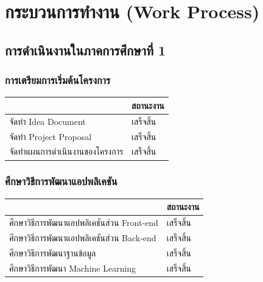 \documentclass[14pt,oneside,openright,a4paper]{cpe-thai-project}
\begin{document}
\section{กระบวนการทำงาน (Work Process)}
\subsection{การดำเนินงานในภาคการศึกษาที่ 1}
  \subsubsection{การเตรียมการเริ่มต้นโครงการ}
    \begin{table}[!h]\centering
      \begin{tabular}{|l|l|}
      \hline
      \rowcolor[HTML]{9FC5E8} 
      \multicolumn{1}{|c|}{\cellcolor[HTML]{9FC5E8}ภาระงาน} & \multicolumn{1}{c|}{\cellcolor[HTML]{9FC5E8}สถานะงาน} \\ \hline
      จัดทำ Idea Document                                 & \cellcolor[HTML]{34FF34}เสร็จสิ้น                        \\ \hline
      จัดทำ Project Proposal                              & \cellcolor[HTML]{34FF34}เสร็จสิ้น                        \\ \hline
      จัดทำแผนการดำเนินงานของโครงการ                      & \cellcolor[HTML]{34FF34}เสร็จสิ้น                        \\ \hline
      \end{tabular}
      \label{tab:Preparation}
      \end{table}

  \subsubsection{ศึกษาวิธีการพัฒนาแอปพลิเคชัน}
    \begin{table}[!h]\centering
      \begin{tabular}{|l|l|}
      \hline
      \rowcolor[HTML]{9FC5E8} 
      \multicolumn{1}{|c|}{\cellcolor[HTML]{9FC5E8}ภาระงาน} & \multicolumn{1}{c|}{\cellcolor[HTML]{9FC5E8}สถานะงาน} \\ \hline
      ศึกษาวิธีการพัฒนาแอปพลิเคชันส่วน Front-end          & \cellcolor[HTML]{34FF34}เสร็จสิ้น                        \\ \hline
      ศึกษาวิธีการพัฒนาแอปพลิเคชันส่วน Back-end              & \cellcolor[HTML]{34FF34}เสร็จสิ้น                        \\ \hline
      ศึกษาวิธีการพัฒนาฐานข้อมูล                          & \cellcolor[HTML]{34FF34}เสร็จสิ้น                        \\ \hline
      ศึกษาวิธีการพัฒนา Machine Learning                  & \cellcolor[HTML]{34FF34}เสร็จสิ้น                        \\ \hline
      \end{tabular}
      \label{tab:DevelopmentLearning}
      \end{table}
\end{document}
